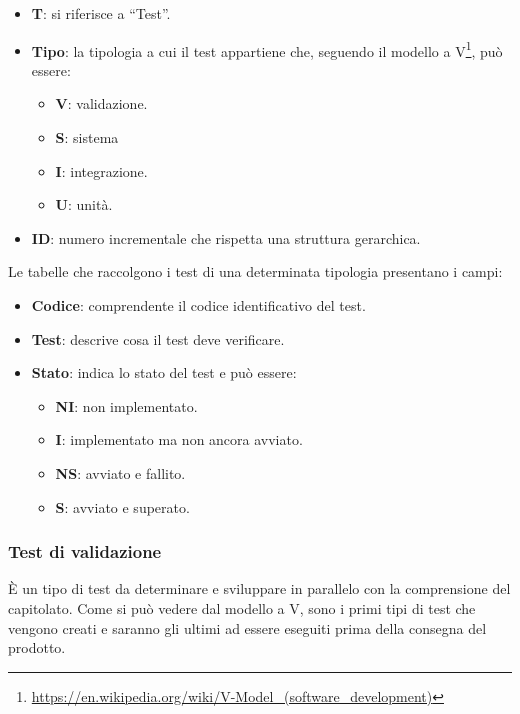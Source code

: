 \begin{itemize}
	\item \textbf{T}: si riferisce a ``Test''.
	\item \textbf{Tipo}: la tipologia a cui il test appartiene che, seguendo il modello a V\footnote{\url{https://en.wikipedia.org/wiki/V-Model_(software_development)}}, può essere:
	\begin{itemize}
		\item \textbf{V}: validazione. %
		\item \textbf{S}: sistema
		\item \textbf{I}: integrazione.
		\item \textbf{U}: unità.
		\end{itemize}
	\item \textbf{ID}: numero incrementale che rispetta una struttura gerarchica.
\end{itemize}

\newcommand{\TNI}{{\color{gray}\textbf{NI}}}
\newcommand{\TI}{{\color{blue}\textbf{I}}}
\newcommand{\TNS}{{\color{red}\textbf{NS}}}
\newcommand{\TS}{{\color{green}\textbf{S}}}

Le tabelle che raccolgono i test di una determinata tipologia presentano i campi:
\begin{itemize}
	\item \textbf{Codice}: comprendente il codice identificativo del test.
	\item \textbf{Test}: descrive cosa il test deve verificare.
	\item \textbf{Stato}: indica lo stato del test e può essere:
	\begin{itemize}
		\item \TNI: non implementato.
		\item \TI: implementato ma non ancora avviato.
		\item \TNS: avviato e fallito.
		\item \TS: avviato e superato.
	\end{itemize}
\end{itemize}

\subsubsection{Test di validazione} \label{testvalidazione} %
È un tipo di test da determinare e sviluppare in parallelo con la comprensione del capitolato.
Come si può vedere dal modello a V, sono i primi tipi di test che vengono creati e saranno gli ultimi ad essere eseguiti prima della consegna del prodotto.

